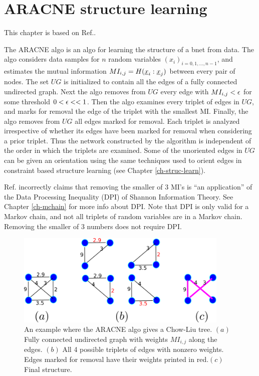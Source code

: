 \chapter{ARACNE structure learning}
\label{ch-aracne}

This chapter
is based on
Ref.\cite{aracne}.

The ARACNE algo
is an algo for learning the structure
of a bnet from data.
The algo
considers data samples
for $n$ random variables
$(x_i)_{i=0, 1, \dots, n-1}$,
and estimates the mutual
information $MI_{i,j}=H({\underline{x}}_i:{\underline{x}}_j)$ between
every pair of nodes.
The set $UG$ is initialized to
contain all the edges of a fully connected
undirected graph.
Next the algo
removes from $UG$
every edge with $MI_{i,j}<\epsilon$
for some threshold $0<\epsilon<<1$.
Then the algo examines every
triplet of edges
in $UG$, and marks for removal 
the edge of the triplet
with the smallest MI.
Finally,
the algo removes from $UG$  all
edges marked for removal.
 Each triplet is analyzed
irrespective of whether its edges
 have been marked for
removal when considering a prior triplet.
Thus the network constructed by the 
algorithm is independent of the
 order in which the triplets are examined.
Some of the unoriented edges in
$UG$
can be given an orientation
using the same techniques
used to orient edges
in constraint based structure
learning (see Chapter \ref{ch-struc-learn}).



Ref.\cite{aracne} incorrectly claims that
removing the smaller of 3 MI's
is \enquote{an application} of the Data Processing
Inequality (DPI)
of Shannon Information Theory. 
See Chapter \ref{ch-mchain}
for more info about DPI.
Note that DPI is
only valid for a Markov chain,
and not all
 triplets of random variables
are in a Markov chain.
Removing the smaller of 
3 numbers does not require DPI.

\begin{figure}[h!]
\centering
\includegraphics[width=4in]
{aracne/aracne.png}
\caption{
An example where the ARACNE algo 
gives a Chow-Liu tree.
$(a)$ Fully connected 
undirected graph with
 weights $MI_{i,j}$
along the edges.
$(b)$ All 4 possible triplets of edges
with nonzero weights.
Edges marked for removal 
have their weights
printed in red.$(c)$
Final structure.} 
\label{fig-aracne}
\end{figure}


